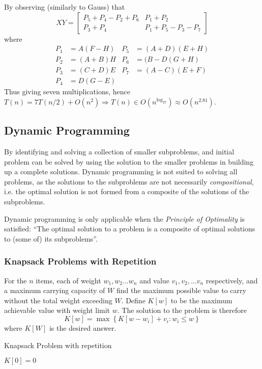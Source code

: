 \documentclass[10pt]{article}
\begin{document}
By observing (similarly to Gauss) that \[XY=\left[\begin{matrix}P_5+P_4-P_2+P_6&P_1+P_2\\P_3+P_4&P_1+P_5-P_3-P_7\end{matrix}\right]\]where
	\begin{align*}
		P_1&=A(F-H)&P_5&=(A+D)(E+H)\\
		P_2&=(A+B)H&P_6&=(B-D(G+H)\\
		P_3&=(C+D)E&P_7&=(A-C)(E+F)\\
		P_4&=D(G-E)&&
	\end{align*}
	Thus giving seven multiplications, hence $T(n)=7T(n/2)+O(n^2)\Rightarrow T(n)\in O\left(n^{\log_27}\right)\approx O\left(n^{2.81}\right)$.
\subsection{Dynamic Programming}
By identifying and solving a collection of smaller subproblems, and initial problem can be solved by using the solution to the smaller problems in building up a complete solutions.  Dynamic programming is not suited to solving all problems, as the solutions to the subproblems are not necessarily \emph{compositional}, i.e. the optimal solution is not formed from a composite of the solutions of the subproblems.

Dynamic programming is only applicable when the \emph{Principle of Optimality} is satisfied: ``The optimal solution to a problem is a composite of optimal solutions to (some of) its subproblems''.
\subsubsection{Knapsack Problems with Repetition}
For the $n$ items, each of weight $w_1,w_2\ldots w_n$ and value $v_1,v_2, \ldots v_n$ respectively, and a maximum carrying capacity of $W$ find the maximum possible value to carry without the total weight exceeding $W$.
Define $K[w]$ to be the maximum achievable value with weight limit $w$.  The solution to the problem is therefore \[K[w] = \max\left\{K\left[w-w_i\right]+v_i:w_i\le w\right\}\] where $K[W]$ is the desired answer.
\begin{algorithm}
\caption{Knapsack Problem with repetition}
$K[0]=0$\;
\;
\end{algorithm}
\end{document}
